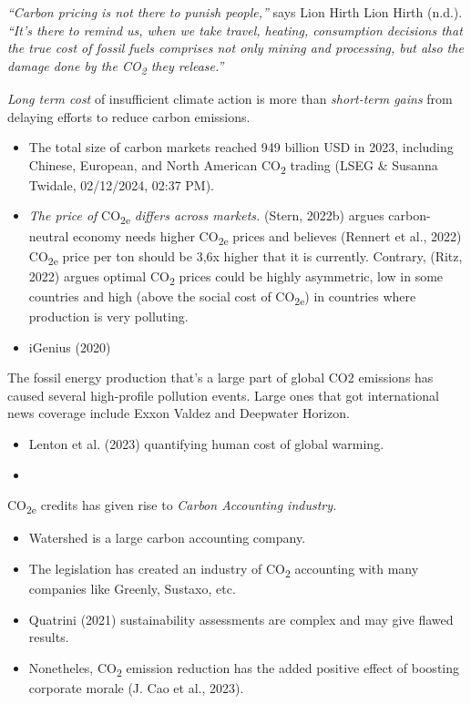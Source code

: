 \documentclass[
  letterpaper,
  DIV=11,
  numbers=noendperiod]{scrartcl}
\providecommand{\tightlist}{%
  \setlength{\itemsep}{0pt}\setlength{\parskip}{0pt}}\usepackage{longtable,booktabs,array}
\begin{document}
\emph{``Carbon pricing is not there to punish people,''} says Lion Hirth
Lion Hirth (n.d.). \emph{``It's there to remind us, when we take travel,
heating, consumption decisions that the true cost of fossil fuels
comprises not only mining and processing, but also the damage done by
the CO\textsubscript{2} they release.''}

\emph{Long term cost} of insufficient climate action is more than
\emph{short-term gains} from delaying efforts to reduce carbon
emissions.

\begin{itemize}
\item
  The total size of carbon markets reached 949 billion USD in 2023,
  including Chinese, European, and North American CO\textsubscript{2}
  trading (LSEG \& Susanna Twidale, 02/12/2024, 02:37 PM).
\item
  \emph{The price of} CO\textsubscript{2e} \emph{differs across
  markets.} (Stern, 2022b) argues carbon-neutral economy needs higher
  CO\textsubscript{2e} prices and believes (Rennert et al., 2022)
  CO\textsubscript{2e} price per ton should be 3,6x higher that it is
  currently. Contrary, (Ritz, 2022) argues optimal CO\textsubscript{2}
  prices could be highly asymmetric, low in some countries and high
  (above the social cost of CO\textsubscript{2e}) in countries where
  production is very polluting.
\item
  iGenius (2020)
\end{itemize}

The fossil energy production that's a large part of global CO2 emissions
has caused several high-profile pollution events. Large ones that got
international news coverage include Exxon Valdez and Deepwater Horizon.

\begin{itemize}
\tightlist
\item
  Lenton et al. (2023) quantifying human cost of global warming.
\item
\end{itemize}

CO\textsubscript{2e} credits has given rise to \emph{Carbon Accounting
industry.}

\begin{itemize}
\item
  Watershed is a large carbon accounting company.
\item
  The legislation has created an industry of CO\textsubscript{2}
  accounting with many companies like Greenly, Sustaxo, etc.
\item
  Quatrini (2021) sustainability assessments are complex and may give
  flawed results.
\item
  Nonetheles, CO\textsubscript{2} emission reduction has the added
  positive effect of boosting corporate morale (J. Cao et al., 2023).
\end{itemize}
\end{document}
